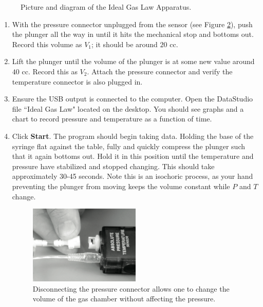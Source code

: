 \begin{figure}
\begin{subfigure}{0.48\textwidth}
\end{subfigure}
\caption{Picture and diagram of the Ideal Gas Law Apparatus.}
\label{idealapp}
\end{figure}

\begin{enumerate}
	\item With the pressure connector unplugged from the sensor (see Figure \ref{pdisc}), push the plunger all the way in until it hits the mechanical stop and bottoms out.  Record this volume as $V_{1}$; it should be around $20$ cc.
	\item Lift the plunger until the volume of the plunger is at some new value around $40$ cc.  Record this as $V_{2}$.  Attach the pressure connector and verify the temperature connector is also plugged in.
	\item Ensure the USB output is connected to the computer.  Open the DataStudio file ``Ideal Gas Law" located on the desktop.  You should see graphs and a chart to record pressure and temperature as a function of time.
	\item Click \textbf{Start}.  The program should begin taking data.  Holding the base of the syringe flat against the table, fully and quickly compress the plunger such that it again bottoms out.  Hold it in this position until the temperature and pressure have stabilized and stopped changing.  This should take approximately 30-45 seconds.  Note this is an isochoric process, as your hand preventing the plunger from moving keeps the volume constant while $P$ and $T$ change.
	\begin{figure}
		\centering
		\includegraphics[width=0.5\textwidth]{./Exp10/pic/pressuregaugepic}
		\caption{Disconnecting the pressure connector allows one to change the volume of the gas chamber without affecting the pressure.}
		\label{pdisc}
	\end{figure}
	

\end{enumerate}
